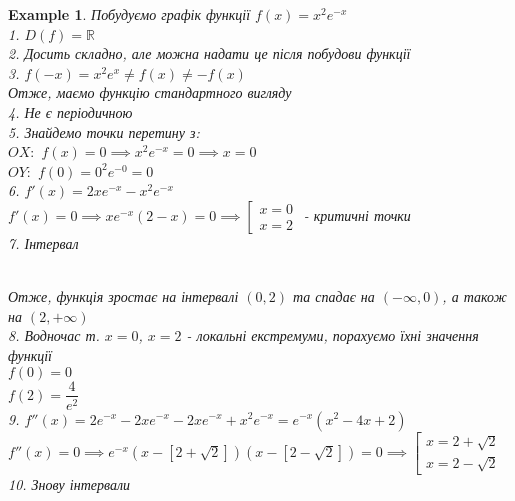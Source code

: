 \documentclass[a4paper, 14pt]{extarticle}
\theoremstyle{theoremdd}
\theoremstyle{theoremdd}
\theoremstyle{theoremdd}
\theoremstyle{theoremdd}
\newtheorem{example}[theorem]{Example}
\theoremstyle{theoremdd}
\theoremstyle{theoremdd}
\theoremstyle{theoremdd}
\theoremstyle{theoremdd}
\begin{document}
\begin{example}
Побудуємо графік функції $f(x) = x^2 e^{-x}$\\
1. $D(f) = \mathbb{R}$\\
2. Досить складно, але можна надати це після побудови функції\\
3. $f(-x) = x^2 e^x \neq f(x) \neq -f(x)$\\
Отже, маємо функцію стандартного вигляду\\
4. Не є періодичною\\
5. Знайдемо точки перетину з:\\
$OX:$ $f(x) = 0 \implies x^2 e^{-x} = 0 \implies x = 0$\\
$OY:$ $f(0) = 0^2 e^{-0} = 0$\\
6. $f'(x) = 2x e^{-x} - x^2 e^{-x}$\\
$f'(x) = 0 \implies x e^{-x}(2-x) = 0 \implies \left[ \begin{gathered} x = 0 \\ x = 2 \end{gathered} \right.$ - критичні точки\\
7. Інтервал\\
\\
Отже, функція зростає на інтервалі $(0,2)$ та спадає на $(-\infty,0)$, а також на $(2,+\infty)$\\
8. Водночас т. $x = 0$, $x = 2$ - локальні екстремуми, порахуємо їхні значення функції\\
$f(0) = 0$\\
$f(2) = \dfrac{4}{e^2}$\\
9. $f''(x) = 2e^{-x} - 2xe^{-x} - 2xe^{-x} +x^2 e^{-x} = e^{-x}(x^2-4x+2)$\\
$f''(x) = 0 \implies e^{-x}(x-[2+\sqrt{2}])(x-[2-\sqrt{2}]) = 0 \implies \left[ \begin{gathered} x = 2 + \sqrt{2} \\ x = 2 - \sqrt{2} \end{gathered} \right.$\\
10. Знову інтервали\\
\end{example}
\end{document}
